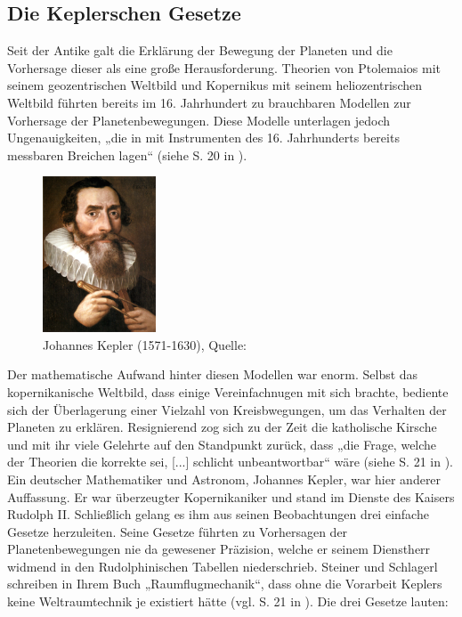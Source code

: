 \subsection{Die Keplerschen Gesetze}
Seit der Antike galt die Erklärung der Bewegung der Planeten und die Vorhersage dieser als eine große Herausforderung. Theorien von Ptolemaios mit seinem geozentrischen Weltbild und Kopernikus mit seinem heliozentrischen Weltbild führten bereits im 16. Jahrhundert zu brauchbaren Modellen zur Vorhersage der Planetenbewegungen. Diese Modelle unterlagen jedoch Ungenauigkeiten, „die in mit Instrumenten des 16. Jahrhunderts bereits messbaren Breichen lagen“ (siehe S. 20 in \cite{Raumflugm}). 
\begin{figure}[h]                                                                           %
	\centering                                                                            	%
	\includegraphics[width=0.3\textwidth]{./images/kepler.jpg}                              %
	\caption[Bahnelemente]{Johannes Kepler (1571-1630), Quelle: \cite{Wiki:Kepler}}         %
	\label{fig:bahnelemente}                                                                %
\end{figure}                                                                              	%
Der mathematische Aufwand hinter diesen Modellen war enorm. Selbst das kopernikanische Weltbild, dass einige Vereinfachnugen mit sich brachte, bediente sich der Überlagerung einer Vielzahl von Kreisbwegungen, um das Verhalten der Planeten zu erklären. Resignierend zog sich zu der Zeit die katholische Kirsche und mit ihr viele Gelehrte auf den Standpunkt zurück, dass „die Frage, welche der Theorien die korrekte sei, [...] schlicht unbeantwortbar“ wäre (siehe S. 21 in \cite{Raumflugm}). 
\newpar
Ein deutscher Mathematiker und Astronom, Johannes Kepler, war hier anderer Auffassung. Er war überzeugter Kopernikaniker und stand im Dienste des Kaisers Rudolph II. Schließlich gelang es ihm aus seinen Beobachtungen drei einfache Gesetze herzuleiten. Seine Gesetze führten zu Vorhersagen der Planetenbewegungen nie da gewesener Präzision, welche er seinem Dienstherr widmend in den Rudolphinischen Tabellen niederschrieb. Steiner und Schlagerl schreiben in Ihrem Buch „Raumflugmechanik“, dass ohne die Vorarbeit Keplers keine Weltraumtechnik je existiert hätte (vgl. S. 21 in \cite{Raumflugm}). Die drei Gesetze lauten:
